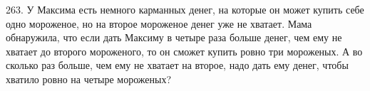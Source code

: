 263. У Максима есть немного карманных денег, на которые он может купить себе одно мороженое, но на второе мороженое денег уже не хватает. Мама обнаружила, что если дать Максиму в четыре раза больше денег, чем ему не хватает до второго мороженого, то он сможет купить ровно три мороженых. А во сколько раз больше, чем ему не хватает на второе, надо дать ему денег, чтобы хватило ровно на четыре мороженых?\\
